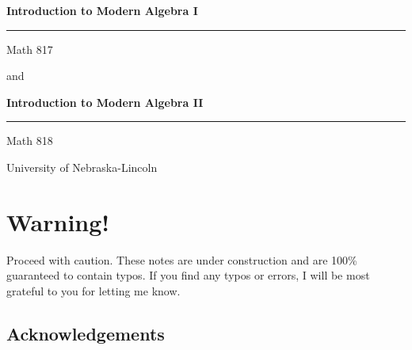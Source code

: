 \documentclass[12pt]{report}
\date{\today}
\numberwithin{equation}{section}
\numberwithin{theorem}{chapter}
\theoremstyle{definition}
\newtheorem*{basic properties}{Basic Properties}
\newtheorem*{Important Remark}{Important Remark}
\begin{document}
\makeatletter
\begin{titlepage}
\centering
{}


\begin{center}

{\LARGE\bfseries Introduction to Modern Algebra I\\}
\rule{3in}{0.4pt}

{Math 817}


\vspace{5em}

and

\vspace{5em}


{\LARGE\bfseries Introduction to Modern Algebra II\\}
\rule{3in}{0.4pt}

{Math 818}

\end{center}



University of Nebraska-Lincoln\\ 


\vspace{2em}

{\small \@date}

\vspace{3em}

\end{titlepage}
\makeatother

\newpage


\chapter*{Warning!}


Proceed with caution. These notes are under construction and are 100\% guaranteed to contain typos. If you find any typos or errors, I will be most grateful to you for letting me know. 


\vspace{1em}


\section*{Acknowledgements}
\end{document}
